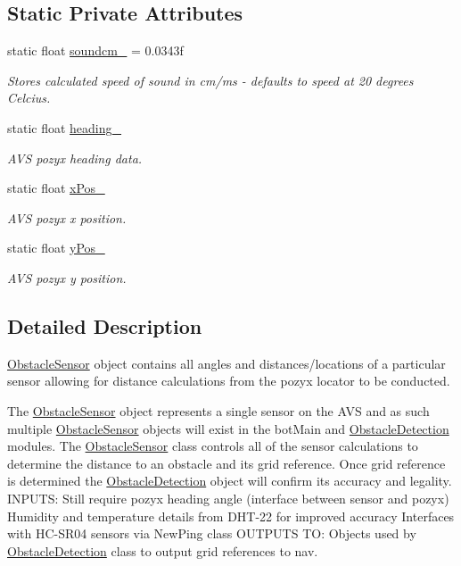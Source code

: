 \subsection*{Static Private Attributes}
\begin{DoxyCompactItemize}
\item 
static float \mbox{\hyperlink{class_obstacle_sensor_ae6d0b250f37a34d04103d43e4e4e0082}{soundcm\+\_\+}} = 0.\+0343f
\begin{DoxyCompactList}\small\item\em Stores calculated speed of sound in cm/ms -\/ defaults to speed at 20 degrees Celcius. \end{DoxyCompactList}\item 
static float \mbox{\hyperlink{class_obstacle_sensor_add4a6ffaf43bcdd08e1a8c0c3956605d}{heading\+\_\+}}
\begin{DoxyCompactList}\small\item\em A\+VS pozyx heading data. \end{DoxyCompactList}\item 
static float \mbox{\hyperlink{class_obstacle_sensor_a108284bfc4bc3ded9aa47973a9d3a442}{x\+Pos\+\_\+}}
\begin{DoxyCompactList}\small\item\em A\+VS pozyx x position. \end{DoxyCompactList}\item 
static float \mbox{\hyperlink{class_obstacle_sensor_a5b34f3938826987d0b1623bb95e4220e}{y\+Pos\+\_\+}}
\begin{DoxyCompactList}\small\item\em A\+VS pozyx y position. \end{DoxyCompactList}\end{DoxyCompactItemize}


\subsection{Detailed Description}
\mbox{\hyperlink{class_obstacle_sensor}{Obstacle\+Sensor}} object contains all angles and distances/locations of a particular sensor allowing for distance calculations from the pozyx locator to be conducted. 

The \mbox{\hyperlink{class_obstacle_sensor}{Obstacle\+Sensor}} object represents a single sensor on the A\+VS and as such multiple \mbox{\hyperlink{class_obstacle_sensor}{Obstacle\+Sensor}} objects will exist in the bot\+Main and \mbox{\hyperlink{class_obstacle_detection}{Obstacle\+Detection}} modules. The \mbox{\hyperlink{class_obstacle_sensor}{Obstacle\+Sensor}} class controls all of the sensor calculations to determine the distance to an obstacle and its grid reference. Once grid reference is determined the \mbox{\hyperlink{class_obstacle_detection}{Obstacle\+Detection}} object will confirm its accuracy and legality. I\+N\+P\+U\+TS\+: Still require pozyx heading angle (interface between sensor and pozyx) Humidity and temperature details from D\+H\+T-\/22 for improved accuracy Interfaces with H\+C-\/\+S\+R04 sensors via New\+Ping class O\+U\+T\+P\+U\+TS TO\+: Objects used by \mbox{\hyperlink{class_obstacle_detection}{Obstacle\+Detection}} class to output grid references to nav. 

